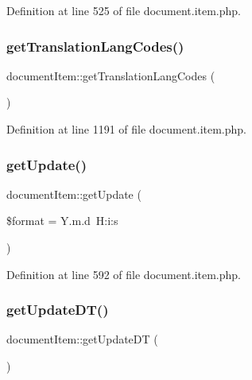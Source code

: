 Definition at line 525 of file document.\+item.\+php.

\mbox{\label{classdocumentItem_afd284f32681755444c28e93c14f55c28}} 
\subsubsection{\texorpdfstring{get\+Translation\+Lang\+Codes()}{getTranslationLangCodes()}}
{\footnotesize\ttfamily document\+Item\+::get\+Translation\+Lang\+Codes (\begin{DoxyParamCaption}{ }\end{DoxyParamCaption})}



Definition at line 1191 of file document.\+item.\+php.

\mbox{\label{classdocumentItem_ae9c92871b66c8f9d93140775d90b88d1}} 
\subsubsection{\texorpdfstring{get\+Update()}{getUpdate()}}
{\footnotesize\ttfamily document\+Item\+::get\+Update (\begin{DoxyParamCaption}\item[{}]{\$format = {\ttfamily \textquotesingle{}Y.m.d~H\+:i\+:s\textquotesingle{}} }\end{DoxyParamCaption})}



Definition at line 592 of file document.\+item.\+php.

\mbox{\label{classdocumentItem_a05139ae1f3934a4db14e4d73b504f534}} 
\subsubsection{\texorpdfstring{get\+Update\+D\+T()}{getUpdateDT()}}
{\footnotesize\ttfamily document\+Item\+::get\+Update\+DT (\begin{DoxyParamCaption}{ }\end{DoxyParamCaption})}



